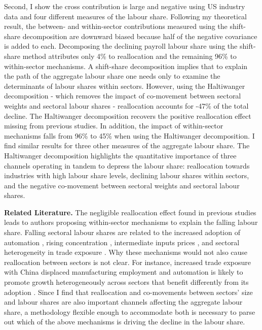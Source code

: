 Second, I show the cross contribution is large and negative using US industry data and four different measures of the labour share. Following my theoretical result, the between- and within-sector contributions measured using the shift-share decomposition are downward biased because half of the negative covariance is added to each. Decomposing the declining payroll labour share using the shift-share method attributes only 4\% to reallocation and the remaining 96\% to within-sector mechanisms. A shift-share decomposition implies that to explain the path of the aggregate labour share one needs only to examine the determinants of labour shares within sectors. However, using the Haltiwanger decomposition - which removes the impact of co-movement between sectoral weights and sectoral labour shares - reallocation accounts for -47\% of the total decline. The Haltiwanger decomposition recovers the positive reallocation effect missing from previous studies. In addition, the impact of within-sector mechanisms falls from 96\% to 45\% when using the Haltiwanger decomposition. I find similar results for three other measures of the aggregate labour share. The Haltiwanger decomposition highlights the quantitative importance of three channels operating in tandem to depress the labour share: reallocation towards industries with high labour share levels, declining labour shares within sectors, and the negative co-movement between sectoral weights and sectoral labour shares. 


 

\vspace{0.3cm}

\textbf{Related Literature.} The negligible reallocation effect found in previous studies leads to authors proposing within-sector mechanisms to explain the falling labour share. Falling sectoral labour shares are related to the increased adoption of automation \citep{acemogluAutomationNewTasks2019}, rising concentration \citep{barkaiDecliningLaborCapital2020}, intermediate inputs prices \citep{castro-vincenziIntermediateInputPrices2022}, and sectoral heterogeneity in trade exposure \citep{elsbyDeclineLaborShare2013a}. Why these mechanisms would not also cause reallocation between sectors is not clear. For instance, increased trade exposure with China displaced manufacturing employment and automation is likely to promote growth heterogeneously across sectors that benefit differently from its adoption \citep{autorChinaSyndromeLocal2013, acemogluAutomationNewTasks2019}. Since I find that reallocation and co-movements between sectors' size and labour shares are also important channels affecting the aggregate labour share, a methodology flexible enough to accommodate both is necessary to parse out which of the above mechanisms is driving the decline in the labour share. 

